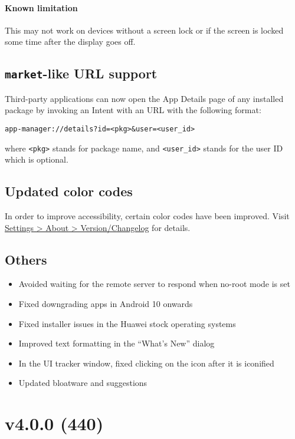 \paragraph{Known limitation} This may not work on devices without a screen lock or if the screen is
locked some time after the display goes off.

\subsection{\texttt{market}-like URL support}
Third-party applications can now open the App Details page of any installed package by invoking an
Intent with an URL with the following format:

\begin{verbatim}
app-manager://details?id=<pkg>&user=<user_id>
\end{verbatim}

where \texttt{<pkg>} stands for package name, and \texttt{<user\_id>} stands for the user ID which
is optional.

\subsection{Updated color codes}
In order to improve accessibility, certain color codes have been improved. Visit
\href{app-manager://settings/about/version}{Settings > About > Version/Changelog} for details.

\subsection{Others}
\begin{itemize}
    \item Avoided waiting for the remote server to respond when no-root mode is set
    \item Fixed downgrading apps in Android 10 onwards
    \item Fixed installer issues in the Huawei stock operating systems
    \item Improved text formatting in the ``What's New'' dialog
    \item In the UI tracker window, fixed clicking on the icon after it is iconified
    \item Updated bloatware and suggestions
\end{itemize}

\section{v4.0.0 (440)}\label{sec:v4.0.0-(440)}

